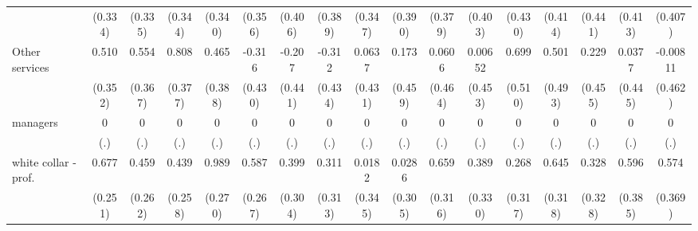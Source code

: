 {\begin{tabular}{l*{16}{c}}
                    &     (0.334)         &     (0.335)         &     (0.344)         &     (0.340)         &     (0.356)         &     (0.406)         &     (0.389)         &     (0.347)         &     (0.390)         &     (0.379)         &     (0.403)         &     (0.430)         &     (0.414)         &     (0.441)         &     (0.413)         &     (0.407)         \\
[1em]
Other services      &       0.510         &       0.554         &       0.808\sym{*}  &       0.465         &      -0.316         &      -0.207         &      -0.312         &      0.0637         &       0.173         &      0.0606         &     0.00652         &       0.699         &       0.501         &       0.229         &      0.0377         &    -0.00811         \\
                    &     (0.352)         &     (0.367)         &     (0.377)         &     (0.388)         &     (0.430)         &     (0.441)         &     (0.434)         &     (0.431)         &     (0.459)         &     (0.464)         &     (0.453)         &     (0.510)         &     (0.493)         &     (0.455)         &     (0.445)         &     (0.462)         \\
[1em]
managers            &           0         &           0         &           0         &           0         &           0         &           0         &           0         &           0         &           0         &           0         &           0         &           0         &           0         &           0         &           0         &           0         \\
                    &         (.)         &         (.)         &         (.)         &         (.)         &         (.)         &         (.)         &         (.)         &         (.)         &         (.)         &         (.)         &         (.)         &         (.)         &         (.)         &         (.)         &         (.)         &         (.)         \\
[1em]
white collar - prof.&       0.677\sym{**} &       0.459         &       0.439         &       0.989\sym{***}&       0.587\sym{*}  &       0.399         &       0.311         &      0.0182         &      0.0286         &       0.659\sym{*}  &       0.389         &       0.268         &       0.645\sym{*}  &       0.328         &       0.596         &       0.574         \\
                    &     (0.251)         &     (0.262)         &     (0.258)         &     (0.270)         &     (0.267)         &     (0.304)         &     (0.313)         &     (0.345)         &     (0.305)         &     (0.316)         &     (0.330)         &     (0.317)         &     (0.318)         &     (0.328)         &     (0.385)         &     (0.369)         \\

\end{tabular}}
